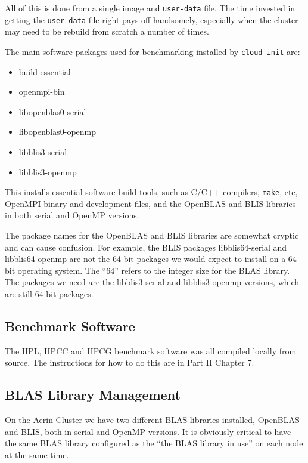 \documentclass{report}
\begin{document}
All of this is done from a single image and \verb|user-data| file. The time invested in getting the \verb|user-data| file right pays off handsomely, especially when the cluster may need to be rebuild from scratch a number of times.

The main software packages used for benchmarking installed by \verb|cloud-init| are:

\begin{itemize}
\item build-essential
\item openmpi-bin
\item libopenblas0-serial
\item libopenblas0-openmp
\item libblis3-serial
\item libblis3-openmp
\end{itemize}

This installs essential software build tools, such as C/C++ compilers, \verb|make|, etc, OpenMPI binary and development files, and the OpenBLAS and BLIS libraries in both serial and OpenMP versions. 

The package names for the OpenBLAS and BLIS libraries are somewhat cryptic and can cause confusion. For example, the BLIS packages libblis64-serial and libblis64-openmp are not the 64-bit packages we would expect to install on a 64-bit operating system. The ``64'' refers to the integer size for the BLAS library. The packages we need are the libblis3-serial and libblis3-openmp versions, which are still 64-bit packages.


%
%
\subsection{Benchmark Software}

The HPL, HPCC and HPCG benchmark software was all compiled locally from source. The instructions for how to do this are in Part II Chapter 7.


%
%
\subsection{BLAS Library Management}

On the Aerin Cluster we have two different BLAS libraries installed, OpenBLAS and BLIS, both in serial and OpenMP versions. It is obviously critical to have the same BLAS library configured as the ``the BLAS library in use'' on each node at the same time.
\end{document}
